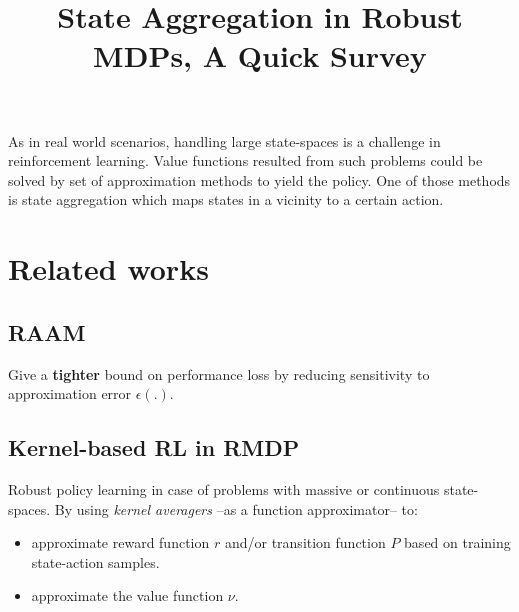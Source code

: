 \documentclass[letterpaper,12pt]{article}
\title{State Aggregation in Robust MDPs, A Quick Survey}
\begin{document}
\maketitle

As in real world scenarios, handling large state-spaces is a challenge in reinforcement learning. Value functions resulted from such problems could be solved by set of approximation methods to yield the policy. One of those methods is state aggregation which maps states in a vicinity to a certain action. 

\section{Related works}

\subsection{RAAM}
Give a \textbf{tighter} bound on performance loss by reducing sensitivity to approximation error $\epsilon(.)$.

\subsection{Kernel-based RL in RMDP}
Robust policy learning in case of problems with massive or continuous state-spaces. By using \textit{kernel averagers} --as a function approximator-- to:
    \begin{itemize}
        \item approximate reward function $r$ and/or transition function $P$ based on training state-action samples.
        \item approximate the value function $\nu$.
    \end{itemize}



% 
% 
\end{document}
